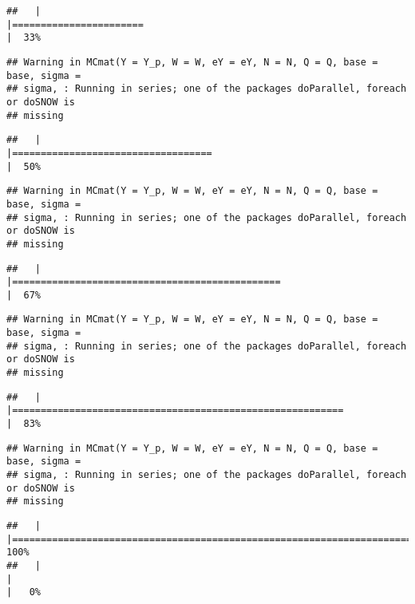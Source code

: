 \documentclass[]{article}
\begin{document}
\begin{verbatim}
##   |                                                                              |=======================                                               |  33%
\end{verbatim}

\begin{verbatim}
## Warning in MCmat(Y = Y_p, W = W, eY = eY, N = N, Q = Q, base = base, sigma =
## sigma, : Running in series; one of the packages doParallel, foreach or doSNOW is
## missing
\end{verbatim}

\begin{verbatim}
##   |                                                                              |===================================                                   |  50%
\end{verbatim}

\begin{verbatim}
## Warning in MCmat(Y = Y_p, W = W, eY = eY, N = N, Q = Q, base = base, sigma =
## sigma, : Running in series; one of the packages doParallel, foreach or doSNOW is
## missing
\end{verbatim}

\begin{verbatim}
##   |                                                                              |===============================================                       |  67%
\end{verbatim}

\begin{verbatim}
## Warning in MCmat(Y = Y_p, W = W, eY = eY, N = N, Q = Q, base = base, sigma =
## sigma, : Running in series; one of the packages doParallel, foreach or doSNOW is
## missing
\end{verbatim}

\begin{verbatim}
##   |                                                                              |==========================================================            |  83%
\end{verbatim}

\begin{verbatim}
## Warning in MCmat(Y = Y_p, W = W, eY = eY, N = N, Q = Q, base = base, sigma =
## sigma, : Running in series; one of the packages doParallel, foreach or doSNOW is
## missing
\end{verbatim}

\begin{verbatim}
##   |                                                                              |======================================================================| 100%
##   |                                                                              |                                                                      |   0%
\end{verbatim}
\end{document}

